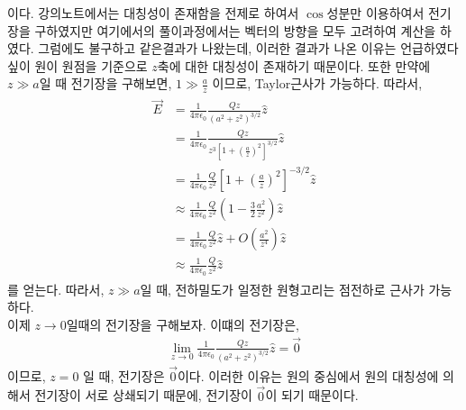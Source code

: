 \documentclass[tightenlines,floatfix,nofootinbib,superscriptaddress,fleqn]{revtex4}
\begin{document}
이다. 강의노트에서는 대칭성이 존재함을 전제로 하여서 $\cos$성분만 이용하여서 전기장을 구하였지만
여기에서의 풀이과정에서는 벡터의 방향을 모두 고려하여 계산을 하였다. 그럼에도 불구하고 같은결과가 나왔는데, 이러한 결과가 나온 이유는 언급하였다 싶이 원이 원점을 기준으로 $z$축에 대한 대칭성이 존재하기 때문이다.
또한 만약에 $z \gg a$일 때 전기장을 구해보면, $1\gg \frac{a}{z}$ 이므로, Taylor근사가 가능하다. 따라서,
\begin{align}
  \begin{split}
    \vec{E}&=\frac{1}{4 \pi \epsilon_0}\frac{Qz}{\left(a^2+z^2\right)^{3/2}}\hat{z}\\
    &=\frac{1}{4 \pi \epsilon_0}\frac{Qz}{z^3\left[1+\left(\frac{a}{z}\right)^2\right]^{3/2}}\hat{z}\\
    &=\frac{1}{4 \pi \epsilon_0}\frac{Q}{z^2}\left[1+\left(\frac{a}{z}\right)^2\right]^{-3/2}\hat{z}\\
    &\approx\frac{1}{4 \pi \epsilon_0}\frac{Q}{z^2}\left(1-\frac{3}{2}\frac{a^2}{z^2}\right)\hat{z}\\
    &=\frac{1}{4 \pi \epsilon_0}\frac{Q}{z^2}\hat{z}+O\left(\frac{a^2}{z^4}\right)\hat{z}\\
    &\approx\frac{1}{4 \pi \epsilon_0}\frac{Q}{z^2}\hat{z}
  \end{split}
\end{align}
를 얻는다. 따라서, $z \gg a$일 때, 전하밀도가 일정한 원형고리는 점전하로 근사가 가능하다.\\
이제 $z\rightarrow 0$일때의 전기장을 구해보자. 이떄의 전기장은,
\begin{align}
  \lim_{z\rightarrow 0}\frac{1}{4 \pi \epsilon_0}\frac{Qz}{\left(a^2+z^2\right)^{3/2}}\hat{z}=\vec{0}
\end{align}
이므로, $z=0$ 일 때, 전기장은 $\vec{0}$이다. 이러한 이유는 원의 중심에서 원의 대칭성에 의해서
전기장이 서로 상쇄되기 때문에, 전기장이 $\vec{0}$이 되기 때문이다.
\vspace{1.cm}
\end{document}
